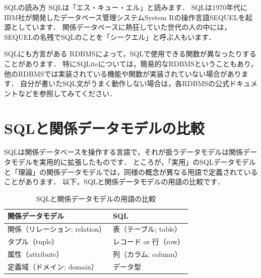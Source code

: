 \begin{notebox}{SQLの読み方}
SQLは「エス・キュー・エル」と読みます．
SQLは1970年代にIBM社が開発したデータベース管理システムSystem Rの操作言語SEQUELを起源としています\cite{SEQUEL}．
関係データベースに熱狂していた世代の人の中には，SEQUELの名残でSQLのことを「シークエル」と呼ぶ人もいます．
\end{notebox}

\begin{warningbox}{SQLにも方言がある}
RDBMSによって，SQLで使用できる関数が異なったりすることがあります．
特にSQLiteについては，簡易的なRDBMSということもあり，他のRDBMSでは実装されている機能や関数が実装されていない場合があります．
自分が書いたSQL文がうまく動作しない場合は，各RDBMSの公式ドキュメントなどを参照してみてください．
\end{warningbox}


\section{SQLと関係データモデルの比較}\label{sec:sql-vs-relational-data-model}
SQLは関係データベースを操作する言語で，それが扱うデータモデルは関係データモデルを実用的に拡張したものです．
ところが，「実用」のSQLデータモデルと「理論」の関係データモデルでは，同様の概念が異なる用語で定義されていることがあります．
以下，SQLと関係データモデルの用語の比較です．

\begin{table}[!htbp]
    \centering
    \caption{SQLと関係データモデルの用語の比較}
    \begin{tabular}{ll}
    \toprule
    \textbf{関係データモデル}             & \textbf{SQL}            \\ \midrule
    関係（リレーション; relation） & 表（テーブル; table） \\
    タプル（tuple）           & レコード or 行（row） \\
    属性（attribute）        & 列（カラム; column） \\
    定義域（ドメイン; domain）    & データ型           \\ \bottomrule
    \end{tabular}
    \label{tab:sql-vs-relational-data-model}
\end{table}

